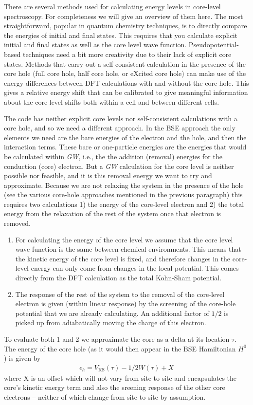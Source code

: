 \documentclass[11pt]{report}
\begin{document}
There are several methods used for calculating energy levels in core-level spectroscopy. For completeness we will give an overview of them here. The most straightforward, popular in quantum chemistry techniques, is to directly compare the energies of initial and final states. This requires that you calculate explicit initial and final states as well as the core level wave function. Pseudopotential-based techniques need a bit more creativity due to their lack of explicit core states. Methods that carry out a self-consistent calculation in the presence of the core hole (full core hole, half core hole, or eXcited core hole) can make use of the energy differences between DFT calculations with and without the core hole. This gives a relative energy shift that can be calibrated to give meaningful information about the core level shifts both within a cell and between different cells.\cite{NeedCites}

The  code has neither explicit core levels nor self-consistent calculations with a core hole, and so we need a different approach. In the BSE approach the only elements we need are the bare energies of the electron and the hole, and then the interaction terms. These bare or one-particle energies are the energies that would be calculated within {\it GW}, i.e., the the addition (removal) energies for the conduction (core) electron. But a {\it GW} calculation for the core level is neither possible nor feasible, and it is this removal energy we want to try and approximate. Because we are not relaxing the system in the presence of the hole (see the various core-hole approaches mentioned in the previous paragraph) this requires two calculations 1) the energy of the core-level electron and 2) the total energy from the relaxation of the rest of the system once that electron is removed. 

\begin{enumerate}
\item
For calculating the energy of the core level we assume that the core level wave function is the same between chemical environments. This means that the kinetic energy of the core level is fixed, and therefore changes in the core-level energy can only come from changes in the local potential. This comes directly from the DFT calculation as the total Kohn-Sham potential.
\item The response of the rest of the system to the removal of the core-level electron is given (within linear response) by the screening of the core-hole potential that we are already calculating. An additional factor of $1/2$ is picked up from adiabatically moving the charge of this electron. 
\end{enumerate}
To evaluate both 1 and 2 we approximate the core as a delta at its location $\tau$. 
The energy of the core hole (as it would then appear in the BSE Hamiltonian $H^0$) is given by
\begin{align}
\epsilon_h = V_\text{KS}(\tau) - 1/2 W(\tau) + X
\end{align}
where X is an offset which will not vary from site to site and encapsulates the core's kinetic energy term and also the sreening response of the other core electrons -- neither of which change from site to site by assumption.
\end{document}
